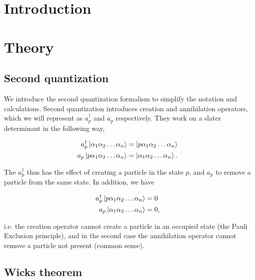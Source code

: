 \documentclass[10pt]{article}
\newcommand{\cop}{a^{\dagger}}
\newcommand{\aop}{a}
\begin{document}
\tableofcontents
\begin{multicols}{2}

\section{Introduction}
\label{sec:introduction}

\section{Theory}
\label{sec:theory}

\subsection{Second quantization}%
\label{sub:second_quantization}

We introduce the second quantization formalism to simplify the notation and
calculations. Second quantization introduces creation and annihilation
operators, which we will represent as $a^{\dagger}_p$ and $a_p$
respectively. They work on a slater determinant in the following way, 

\begin{align*}
    \cop_p \ket{\alpha_1\alpha_2\dots\alpha_n} &=
    \ket{p\alpha_1\alpha_2\dots\alpha_n}\\
    \aop_p \ket{p\alpha_1\alpha_2\dots\alpha_n} &=
    \ket{\alpha_1\alpha_2\dots\alpha_n}.
\end{align*}

The $\cop_p$ thus has the effect of creating a particle in the state $p$, and
$\aop_p$ to remove a particle from the same state. In addition, we have 

\begin{align*}
    \cop_p \ket{p\alpha_1\alpha_2\dots\alpha_n} &= 0\\
    \aop_p \ket{\alpha_1\alpha_2\dots\alpha_n} &= 0,
\end{align*}

i.e. the creation operator cannot create a particle in an occupied state
(the Pauli Exclusion principle), and in the second case the annihilation
operator cannot remove a particle not present (common sense).



\subsection{Wicks theorem}%
\label{sub:wicks_theorem}


\end{multicols}
\end{document}
